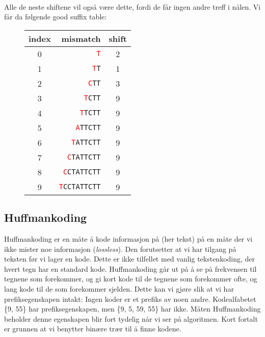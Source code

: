 \begin{example}
~\\Alle de neste shiftene vil også være dette, fordi de får ingen andre treff i nålen. Vi får da følgende good suffix table:
\begin{figure}[H]
\centering
\begin{tabular}{crc}
index&mismatch&shift\\
\hline
0&\texttt{\textcolor{red}{T}}&2\\
1&\texttt{\textcolor{red}{T}T}&1\\
2&\texttt{\textcolor{red}{C}TT}&3\\
3&\texttt{\textcolor{red}{T}CTT}&9\\
4&\texttt{\textcolor{red}{T}TCTT}&9\\
5&\texttt{\textcolor{red}{A}TTCTT}&9\\
6&\texttt{\textcolor{red}{T}ATTCTT}&9\\
7&\texttt{\textcolor{red}{C}TATTCTT}&9\\
8&\texttt{\textcolor{red}{C}CTATTCTT}&9\\
9&\texttt{\textcolor{red}{T}CCTATTCTT}&9\\
\end{tabular}
\end{figure}
\end{example}

	\subsection{Huffmankoding}\label{huffman}
		Huffmankoding er en måte å kode informasjon på (her tekst) på en måte der vi ikke mister noe informasjon (\textit{lossless}). Den forutsetter at vi har tilgang på teksten før vi lager en kode. Dette er ikke tilfellet med vanlig tekstenkoding, der hvert tegn har en standard kode. Huffmankoding går ut på å se på frekvensen til tegnene som forekommer, og gi kort kode til de tegnene som forekommer ofte, og lang kode til de som forekommer sjelden. Dette kan vi gjøre slik at vi har prefiksegenskapen intakt: Ingen koder er et prefiks av noen andre. Kodealfabetet \{9, 55\} har prefiksegenskapen, men \{9, 5, 59, 55\} har ikke. Måten Huffmankoding beholder denne egenskapen blir fort tydelig når vi ser på algoritmen. Kort fortalt er grunnen at vi benytter binære trær til å finne kodene.
		
